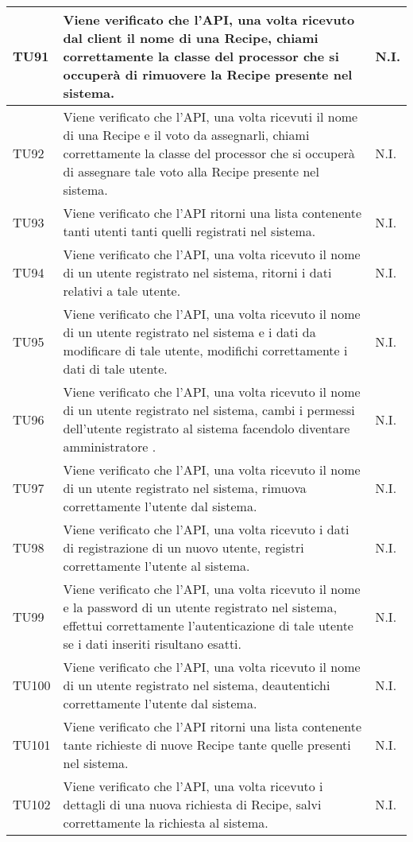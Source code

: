 \begin{center}
\begin{longtable}{| p{2cm} | p{8cm} | p{2.5cm} |}
					\hline
					TU91 & Viene verificato che l'API, una volta ricevuto dal client il nome di una Recipe, chiami correttamente la classe del processor che si occuperà di rimuovere la Recipe presente nel sistema. & N.I.\\
					\hline
					TU92 & Viene verificato che l'API, una volta ricevuti il nome di una Recipe e il voto da assegnarli, chiami correttamente la classe del processor che si occuperà di assegnare tale voto alla Recipe presente nel sistema. & N.I.\\
					\hline
					TU93 & Viene verificato che l'API ritorni una lista contenente tanti utenti tanti quelli registrati nel sistema. & N.I.\\
					\hline
					TU94 & Viene verificato che l'API, una volta ricevuto il nome di un utente registrato nel sistema, ritorni i dati relativi a tale utente. & N.I.\\
					\hline
					TU95 & Viene verificato che l'API, una volta ricevuto il nome di un utente registrato nel sistema e i dati da modificare di tale utente, modifichi correttamente i dati di tale utente. & N.I.\\
					\hline
					TU96 & Viene verificato che l'API, una volta ricevuto il nome di un utente registrato nel sistema, cambi i permessi dell'utente registrato al sistema facendolo diventare amministratore . & N.I.\\
					\hline
					TU97 & Viene verificato che l'API, una volta ricevuto il nome di un utente registrato nel sistema, rimuova correttamente l'utente dal sistema. & N.I.\\
					\hline
					TU98 & Viene verificato che l'API, una volta ricevuto i dati di registrazione di un nuovo utente, registri correttamente l'utente al sistema. & N.I.\\
					\hline
					TU99 & Viene verificato che l'API, una volta ricevuto il nome e la password di un utente registrato nel sistema, effettui correttamente l'autenticazione di tale utente se i dati inseriti risultano esatti. & N.I.\\
					\hline
					TU100 & Viene verificato che l'API, una volta ricevuto il nome di un utente registrato nel sistema, deautentichi correttamente l'utente dal sistema. & N.I.\\
					\hline
					TU101 & Viene verificato che l'API ritorni una lista contenente tante richieste di nuove Recipe tante quelle presenti nel sistema. & N.I.\\
					\hline
					TU102 & Viene verificato che l'API, una volta ricevuto i dettagli di una nuova richiesta di Recipe, salvi correttamente la richiesta al sistema. & N.I.\\

\end{longtable}
\end{center}
